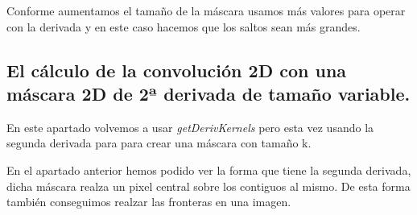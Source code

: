 \documentclass{article}
\begin{document}
Conforme aumentamos el tamaño de la máscara usamos más valores para operar con la derivada y en este caso hacemos que los saltos sean más grandes.


\newpage
\subsection{El cálculo de la convolución 2D con una máscara 2D de 2ª derivada de tamaño variable. }

En este apartado volvemos a usar \textit{getDerivKernels} pero esta vez usando la segunda derivada para para crear una máscara con tamaño k.

En el apartado anterior hemos podido ver la forma que tiene la segunda derivada, dicha máscara realza un pixel central sobre los contiguos al mismo. De esta forma también conseguimos realzar las fronteras en una imagen.
\end{document}
